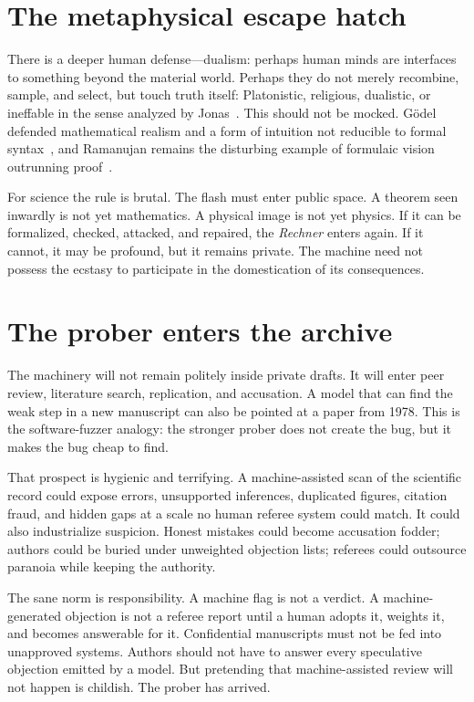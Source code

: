 \documentclass[
  aps,
  reprint,
  superscriptaddress,
  floatfix,
  nofootinbib,
  longbibliography
]{revtex4-2}
\begin{document}
\section{The metaphysical escape hatch}

There is a deeper human defense---dualism: perhaps human minds are interfaces to
something beyond the material world. Perhaps they do not merely recombine,
sample, and select, but touch truth itself: Platonistic, religious, dualistic,
or ineffable in the sense analyzed by Jonas~\cite{Jonas-ineffability}. This
should not be mocked. G\"odel defended mathematical realism and a form of
intuition not reducible to formal syntax~\cite{godel1964cantor,parsons1995platonism},
and Ramanujan remains the disturbing example of formulaic vision outrunning
proof~\cite{hardy1940ramanujan,berndt1998ramanujan,berndt2020living}.

For science the rule is brutal. The flash must enter public space. A theorem
seen inwardly is not yet mathematics. A physical image is not yet physics. If it
can be formalized, checked, attacked, and repaired, the \emph{Rechner} enters
again. If it cannot, it may be profound, but it remains private. The machine
need not possess the ecstasy to participate in the domestication of its
consequences.

\section{The prober enters the archive}

The machinery will not remain politely inside private drafts. It will enter peer
review, literature search, replication, and accusation. A model that can find the
weak step in a new manuscript can also be pointed at a paper from 1978. This is
the software-fuzzer analogy: the stronger prober does not create the bug, but it
makes the bug cheap to find.

That prospect is hygienic and terrifying. A machine-assisted scan of the
scientific record could expose errors, unsupported inferences, duplicated
figures, citation fraud, and hidden gaps at a scale no human referee system could
match. It could also industrialize suspicion. Honest mistakes could become
accusation fodder; authors could be buried under unweighted objection lists;
referees could outsource paranoia while keeping the authority.

The sane norm is responsibility. A machine flag is not a verdict. A
machine-generated objection is not a referee report until a human adopts it,
weights it, and becomes answerable for it. Confidential manuscripts must not be
fed into unapproved systems. Authors should not have to answer every speculative
objection emitted by a model. But pretending that machine-assisted review will
not happen is childish. The prober has arrived.
\end{document}
